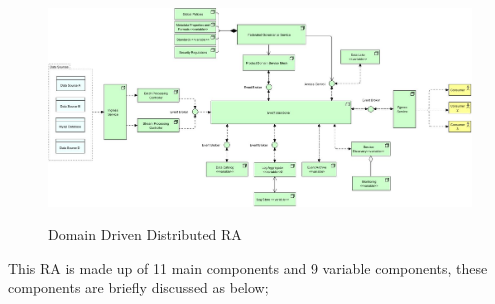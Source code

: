 \documentclass[runningheads]{llncs}
\begin{document}
\begin{figure}[h!]
    \centering
    \includegraphics[width=12cm]{Media/Metamycelium.jpg}
    \label{RA}
    \caption{Domain Driven Distributed RA}
\end{figure}

This RA is made up of 11 main components and 9 variable components, these components are briefly discussed as below; 
\end{document}
